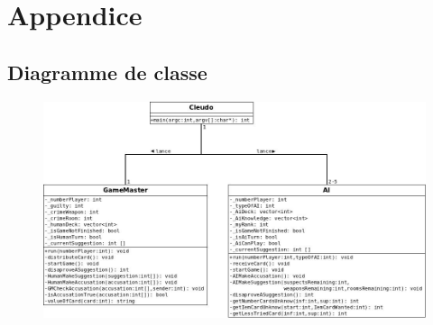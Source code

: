 \documentclass[a4paper,10pt]{article}
\begin{document}
 	
 	
 	

\pagebreak
\section{Appendice}
	
	
	  	
	 \subsection{Diagramme de classe}\hypertarget{classDiag}{}
		\begin{figure}[H] \hspace*{-2cm} 
    	\centering
   		  \includegraphics[width=500pt]{Diag-Classe.jpeg} 
	  	\end{figure}
	 
	 
\end{document}

